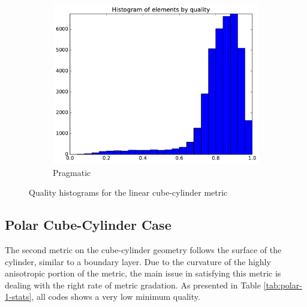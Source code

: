 \documentclass[3p,times,procedia,number]{elsarticle}
\begin{document}
\begin{figure}
\begin{subfigure}{.24\textwidth}
\includegraphics[width=\textwidth]{pragmatic-cube-cylinder-linear-quality.pdf}
\caption{Pragmatic}
\end{subfigure}
\caption{Quality histograms for the linear cube-cylinder metric}
\label{fig:cube-cylinder-linear-qualities}
\end{figure}

\subsection{Polar Cube-Cylinder Case}

The second metric on the cube-cylinder geometry follows the surface
of the cylinder, similar to a boundary layer.
Due to the curvature of the highly anisotropic portion of the metric,
the main issue in satisfying this metric is dealing with the
right rate of metric gradation.
As presented in Table \ref{tab:polar-1-stats}, all codes shows
a very low minimum quality.
\end{document}
